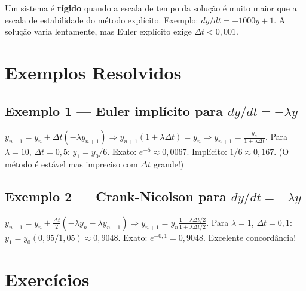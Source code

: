 \documentclass[12pt,a4paper]{article}
\begin{document}
Um sistema \'e \textbf{r\'igido} quando a escala de tempo da solu\c{c}\~ao \'e muito maior que a escala de estabilidade do m\'etodo expl\'icito. Exemplo: $dy/dt = -1000y + 1$. A solu\c{c}\~ao varia lentamente, mas Euler expl\'icito exige $\Delta t < 0{,}001$.

\section*{Exemplos Resolvidos}

\subsection*{Exemplo 1 --- Euler impl\'icito para $dy/dt = -\lambda y$}
$y_{n+1} = y_n + \Delta t(-\lambda y_{n+1}) \Rightarrow y_{n+1}(1+\lambda\Delta t) = y_n \Rightarrow y_{n+1} = \frac{y_n}{1+\lambda\Delta t}$.
Para $\lambda=10$, $\Delta t=0{,}5$: $y_1 = y_0/6$. Exato: $e^{-5} \approx 0{,}0067$. Impl\'icito: $1/6 \approx 0{,}167$.
(O m\'etodo \'e est\'avel mas impreciso com $\Delta t$ grande!)

\subsection*{Exemplo 2 --- Crank-Nicolson para $dy/dt = -\lambda y$}
$y_{n+1} = y_n + \frac{\Delta t}{2}(-\lambda y_n - \lambda y_{n+1}) \Rightarrow y_{n+1} = y_n\frac{1-\lambda\Delta t/2}{1+\lambda\Delta t/2}$.
Para $\lambda=1$, $\Delta t=0{,}1$: $y_1 = y_0(0{,}95/1{,}05) \approx 0{,}9048$. Exato: $e^{-0{,}1} = 0{,}9048$. Excelente concord\^ancia!

\section*{Exerc\'icios}
\end{document}
